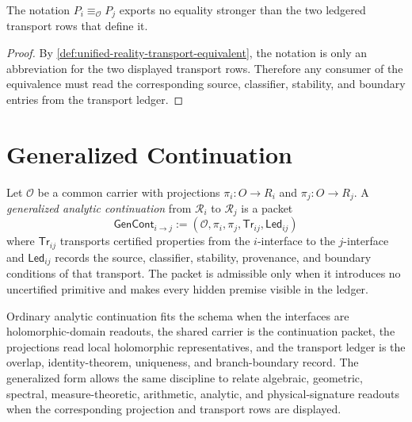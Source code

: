 \begin{corollary}
\label{cor:unified-reality-projection-equivalence-ledger-relative}
The notation $P_i\equiv_{\mathcal O}P_j$ exports no equality stronger
than the two ledgered transport rows that define it.
\end{corollary}

\begin{proof}
By \autoref{def:unified-reality-transport-equivalent}, the notation is
only an abbreviation for the two displayed transport rows. Therefore any
consumer of the equivalence must read the corresponding source,
classifier, stability, and boundary entries from the transport ledger.
\end{proof}

\section{Generalized Continuation}
\label{sec:unified-reality-generalized-continuation}

\begin{definition}
\label{def:unified-reality-generalized-analytic-continuation}
Let $\mathcal O$ be a common carrier with projections
$\pi_i:O\to R_i$ and $\pi_j:O\to R_j$. A \emph{generalized analytic
continuation} from $\mathcal R_i$ to $\mathcal R_j$ is a packet
$$
\mathsf{GenCont}_{i\to j}
:=
(\mathcal O,\pi_i,\pi_j,\mathsf{Tr}_{ij},\mathsf{Led}_{ij})
$$
where $\mathsf{Tr}_{ij}$ transports certified properties from the
$i$-interface to the $j$-interface and $\mathsf{Led}_{ij}$ records the
source, classifier, stability, provenance, and boundary conditions of
that transport. The packet is admissible only when it introduces no
uncertified primitive and makes every hidden premise visible in the
ledger.
\end{definition}

\begin{remark}
\label{rem:unified-reality-ordinary-analytic-continuation-special-case}
Ordinary analytic continuation fits the schema when the interfaces are
holomorphic-domain readouts, the shared carrier is the continuation
packet, the projections read local holomorphic representatives, and the
transport ledger is the overlap, identity-theorem, uniqueness, and
branch-boundary record. The generalized form allows the same discipline
to relate algebraic, geometric, spectral, measure-theoretic, arithmetic,
analytic, and physical-signature readouts when the corresponding
projection and transport rows are displayed.
\end{remark}

